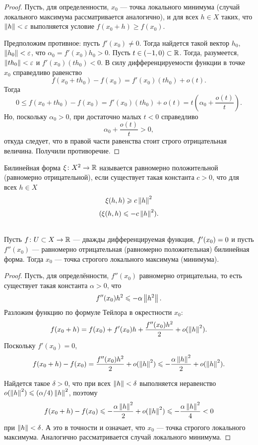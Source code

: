 \begin{proof}
    Пусть, для определенности, $x_0$ --- точка локального минимума (случай локального максимума
    рассматривается аналогично), и для всех $h \in X$ таких, что $\left\|h\right\| < \varepsilon$ 
    выполняется условие $f(x_0 + h) \geq f(x_0)$.

    Предположим противное: пусть $f'(x_0) \neq 0$. Тогда найдется такой вектор $h_0$, 
    $\left\|h_0\right\| < \varepsilon$, что $\alpha_0 = f'(x_0)h_0 > 0$. Пусть 
    $t \in (-1, 0) \subset \mathbb{R}$.
    Тогда, разумеется, $\left\|t h_0\right\| < \varepsilon$ и $f'(x_0)(th_0) < 0$.
    В силу дифференцируемости функции в точке $x_0$ справедливо равенство
    \[ f(x_0 + t h_0) - f(x_0) = f'(x_0)(th_0) + o(t). \]
    Тогда
    \[ 0 \leq f(x_0 + t h_0) - f(x_0) = f'(x_0)(t h_0) + o(t) = t \left( \alpha_0 +
         \frac{o(t)}{t} \right). \]
    Но, поскольку $\alpha_0 > 0$, при достаточно малых $t < 0$ справедливо
    \[ \alpha_0 + \frac{o(t)}{t} > 0, \]
    откуда следует, что в правой части равенства стоит строго отрицательная величина. 
    Получили противоречие.
\end{proof}

\begin{definition}
    Билинейная форма $\xi \colon X^2 \to \mathbb{R}$ называется равномерно положительной (равномерно
    отрицательной), если существует такая константа $c > 0$, что для всех $h \in X$
    \[ \xi(h, h) \geqslant c \left\|h\right\|^2 \]
    \[ (\xi(h, h) \leqslant -c \left\|h\right\|^2). \]
\end{definition}

\begin{theorem}\hfill\\
    \indent Пусть $f \colon U \subset X \to \mathbb{R}$ --- дважды дифференцируемая функция, 
    $f'(x_0) \hm= 0$
    и пусть $f''(x_0)$ --- равномерно отрицательная (равномерно положительная) билинейная форма.
    Тогда $x_0$ --- точка строгого локального максимума (минимума).
\end{theorem}

\begin{proof}
    Пусть, для определённости, $f''(x_0)$ равномерно отрицательна, 
    то есть существует такая константа $\alpha > 0$, что
    \[ f''(x_0)h^2 \leqslant -\alpha\left\|h^2\right\|. \]
    Разложим функцию по формуле Тейлора в окрестности $x_0$:
    \[ f(x_0+h) = f(x_0) + f'(x_0)h + \frac{f''(x_0)h^2}{2} + o(\left\|h\right\|^2). \]
    Поскольку $f'(x_0) = 0$,
    \[ f(x_0+h) - f(x_0) = \frac{f''(x_0)h^2}{2} + o(\left\|h\right\|^2) \leqslant 
        -\frac{\alpha \left\|h\right\|^2}{2} + o(\left\|h\right\|^2). \]

    Найдется такое $\delta > 0$, что при всех $\left\|h\right\| < \delta$ выполняется 
    неравенство $o(\norm{h}^2) \hm\leq (\alpha/4)\norm{h}^2$, поэтому
    \[ f(x_0+h) - f(x_0) \leqslant -\frac{\alpha \left\|h\right\|^2}{2} + o(\left\|h\right\|^2) \leqslant 
        -\frac{\alpha \left\|h\right\|^2}{4} < 0 \]
    при $\left\|h\right\| < \delta$. А это в точности и означает, что $x_0$ --- точка строгого 
    локального максимума. Аналогично рассматривается случай локального минимума.
\end{proof}
